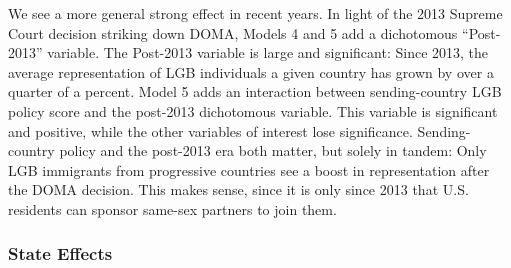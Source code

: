 \documentclass[
  12pt,
]{article}
\begin{document}
We see a more general strong effect in recent years. In light of the 2013 Supreme Court decision striking down DOMA, Models 4 and 5 add a dichotomous ``Post-2013'' variable. The Post-2013 variable is large and significant: Since 2013, the average representation of LGB individuals a given country has grown by over a quarter of a percent. Model 5 adds an interaction between sending-country LGB policy score and the post-2013 dichotomous variable. This variable is significant and positive, while the other variables of interest lose significance. Sending-country policy and the post-2013 era both matter, but solely in tandem: Only LGB immigrants from progressive countries see a boost in representation after the DOMA decision. This makes sense, since it is only since 2013 that U.S. residents can sponsor same-sex partners to join them.

\hypertarget{state-effects}{%
\subsubsection{State Effects}\label{state-effects}}
\end{document}
